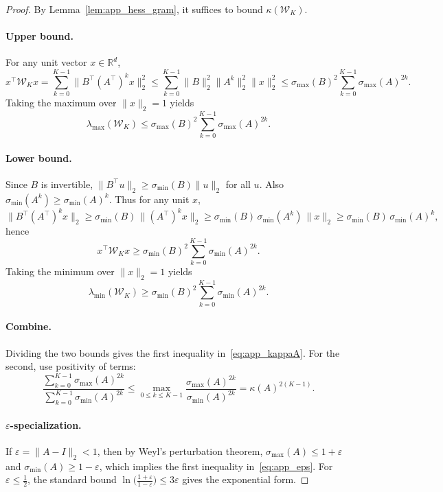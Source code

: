 \begin{proof}
By Lemma~\ref{lem:app_hess_gram}, it suffices to bound $\kappa(\mathcal W_K)$.

\paragraph{Upper bound.}
For any unit vector $x\in\mathbb{R}^d$,
\[
x^\top \mathcal W_K x = \sum_{k=0}^{K-1}\|B^\top (A^\top)^k x\|_2^2
\le
\sum_{k=0}^{K-1}\|B\|_2^2\|A^k\|_2^2\|x\|_2^2
\le
\sigma_{\max}(B)^2\sum_{k=0}^{K-1}\sigma_{\max}(A)^{2k}.
\]
Taking the maximum over $\|x\|_2=1$ yields
\[
\lambda_{\max}(\mathcal W_K)\le \sigma_{\max}(B)^2\sum_{k=0}^{K-1}\sigma_{\max}(A)^{2k}.
\]

\paragraph{Lower bound.}
Since $B$ is invertible, $\|B^\top u\|_2\ge \sigma_{\min}(B)\|u\|_2$ for all $u$.
Also $\sigma_{\min}(A^k)\ge \sigma_{\min}(A)^k$. Thus for any unit $x$,
\[
\|B^\top(A^\top)^k x\|_2
\ge
\sigma_{\min}(B)\,\|(A^\top)^k x\|_2
\ge
\sigma_{\min}(B)\,\sigma_{\min}(A^k)\,\|x\|_2
\ge
\sigma_{\min}(B)\,\sigma_{\min}(A)^k,
\]
hence
\[
x^\top \mathcal W_K x
\ge
\sigma_{\min}(B)^2\sum_{k=0}^{K-1}\sigma_{\min}(A)^{2k}.
\]
Taking the minimum over $\|x\|_2=1$ yields
\[
\lambda_{\min}(\mathcal W_K)\ge \sigma_{\min}(B)^2\sum_{k=0}^{K-1}\sigma_{\min}(A)^{2k}.
\]

\paragraph{Combine.}
Dividing the two bounds gives the first inequality in~\eqref{eq:app_kappaA}.
For the second, use positivity of terms:
\[
\frac{\sum_{k=0}^{K-1}\sigma_{\max}(A)^{2k}}{\sum_{k=0}^{K-1}\sigma_{\min}(A)^{2k}}
\le
\max_{0\le k\le K-1}\frac{\sigma_{\max}(A)^{2k}}{\sigma_{\min}(A)^{2k}}
=
\kappa(A)^{2(K-1)}.
\]

\paragraph{$\varepsilon$-specialization.}
If $\varepsilon=\|A-I\|_2<1$, then by Weyl's perturbation theorem,
$\sigma_{\max}(A)\le 1+\varepsilon$ and $\sigma_{\min}(A)\ge 1-\varepsilon$,
which implies the first inequality in~\eqref{eq:app_eps}.
For $\varepsilon\le \tfrac12$, the standard bound
$\ln\!\big(\frac{1+\varepsilon}{1-\varepsilon}\big)\le 3\varepsilon$
gives the exponential form.
\end{proof}

